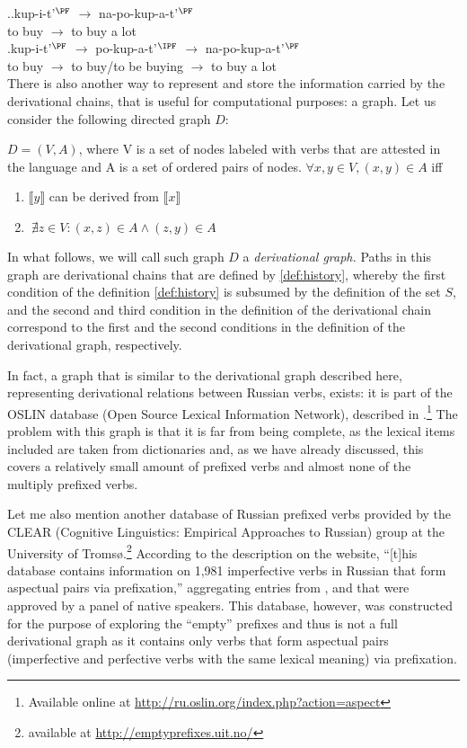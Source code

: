 \ex.\label{ex:napokupat}\ag.\label{ex:napokupat1}kup-i-t'$^\PF$ $\rightarrow$ na-po-kup-a-t'$^\PF$\\	
{to buy} $\rightarrow$ {to buy a lot}\\
\bg.\label{ex:napokupat2}kup-i-t'$^\PF$ $\rightarrow$ po-kup-a-t'$^\IPF$ $\rightarrow$ na-po-kup-a-t'$^\PF$\\
{to buy} $\rightarrow$ {to buy/to be buying} $\rightarrow$ {to buy a lot}\\

There is also another way to represent and store the information carried by the derivational chains, that is useful for computational purposes: a graph. Let us consider the following directed graph $D$: 
\begin{definition}\label{def:chain}
$D = (V,A)$, where V is a set of nodes labeled with verbs that are attested in the language and A is a set of ordered pairs of nodes. $\forall x,y \in V, (x,y) \in A$ iff 
\begin{enumerate}
\item $\llbracket y \rrbracket$ can be derived from $\llbracket x \rrbracket$
\item $~\nexists z \in V: (x,z) \in A \wedge (z,y) \in A$
\end{enumerate}
\end{definition}

In what follows, we will call such graph $D$ a \textit{derivational graph.} Paths in this graph are derivational chains that are defined by \ref{def:history}, whereby the first condition of the definition \ref{def:history} is subsumed by the definition of the set $S$, and the second and third condition in the definition of the derivational chain correspond to the first and the second conditions in the definition of the derivational graph, respectively.

In fact, a graph that is similar to the derivational graph described here, representing derivational relations between Russian verbs, exists: it is part of the OSLIN database (Open Source Lexical Information Network), described in \cite{Borik:12}.\footnote{Available online at \url{http://ru.oslin.org/index.php?action=aspect}} The problem with this graph is that it is far from being complete, as the lexical items included are taken from dictionaries and, as we have already discussed, this covers a relatively small amount of prefixed verbs and almost none of the multiply prefixed verbs.

Let me also mention another database of Russian prefixed verbs provided by the CLEAR (Cognitive Linguistics: Empirical Approaches to Russian) group at the University
of Troms{\o}.\footnote{available at \url{http://emptyprefixes.uit.no/}} According to the description on the website, ``[t]his database contains information on 1,981 imperfective verbs in Russian that form aspectual pairs via prefixation,'' aggregating entries from \citet{MAS,  Ozegov:01},  and \citet{Cubberly:82} that were approved by a panel of native speakers. This database, however, was constructed for the purpose of exploring the ``empty'' prefixes and thus is not a full derivational graph as it contains only verbs that form aspectual pairs (imperfective and perfective verbs with the same lexical meaning) via prefixation.

